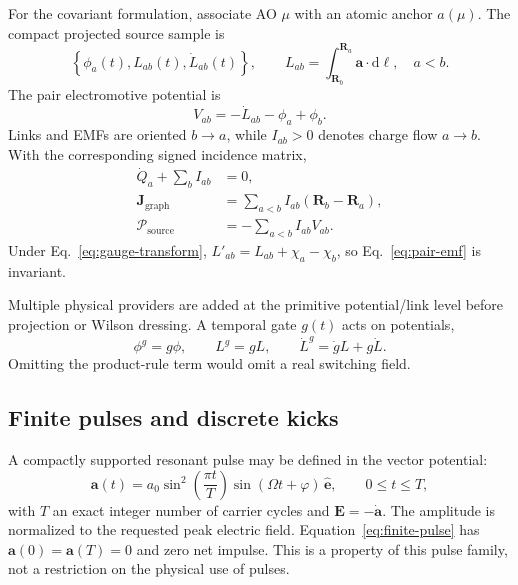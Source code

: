 \documentclass[11pt]{article}
\newcommand{\dd}{\mathrm{d}}
\newcommand{\vect}[1]{\bm{#1}}
\begin{document}
For the covariant formulation, associate AO \(\mu\) with an atomic anchor
\(a(\mu)\). The compact projected source sample is
\begin{equation}
 \left\{\phi_a(t),L_{ab}(t),\dot L_{ab}(t)\right\},\qquad
 L_{ab}=\int_{\vect R_b}^{\vect R_a}\vect a\cdot\dd\vect\ell,
 \quad a<b .
 \label{eq:source-sample}
\end{equation}
The pair electromotive potential is
\begin{equation}
 V_{ab}=-\dot L_{ab}-\phi_a+\phi_b.
 \label{eq:pair-emf}
\end{equation}
Links and EMFs are oriented \(b\to a\), while \(I_{ab}>0\) denotes
charge flow \(a\to b\). With the corresponding signed incidence matrix,
\begin{align}
 \dot Q_a+\sum_b I_{ab}&=0,\label{eq:continuity}\\
 \vect J_{\mathrm{graph}}
   &=\sum_{a<b}I_{ab}(\vect R_b-\vect R_a),\label{eq:graph-current}\\
 \mathcal P_{\mathrm{source}}
   &=-\sum_{a<b}I_{ab}V_{ab}.\label{eq:graph-power}
\end{align}
Under Eq.~\eqref{eq:gauge-transform},
\(L'_{ab}=L_{ab}+\chi_a-\chi_b\), so Eq.~\eqref{eq:pair-emf} is invariant.

Multiple physical providers are added at the primitive potential/link level
before projection or Wilson dressing. A temporal gate \(g(t)\) acts on
potentials,
\begin{equation}
 \phi^g=g\phi,\qquad L^g=gL,\qquad
 \dot L^g=\dot g L+g\dot L.
\end{equation}
Omitting the product-rule term would omit a real switching field.

\subsection{Finite pulses and discrete kicks}

A compactly supported resonant pulse may be defined in the vector potential:
\begin{equation}
 \vect a(t)=a_0
 \sin^2\!\left(\frac{\pi t}{T}\right)
 \sin(\Omega t+\varphi)\,\hat{\vect e},
 \qquad 0\le t\le T,
 \label{eq:finite-pulse}
\end{equation}
with \(T\) an exact integer number of carrier cycles and
\(\vect E=-\dot{\vect a}\). The amplitude is normalized to the requested
peak electric field. Equation~\eqref{eq:finite-pulse} has
\(\vect a(0)=\vect a(T)=0\) and zero net impulse. This is a property of this
pulse family, not a restriction on the physical use of pulses.
\end{document}
